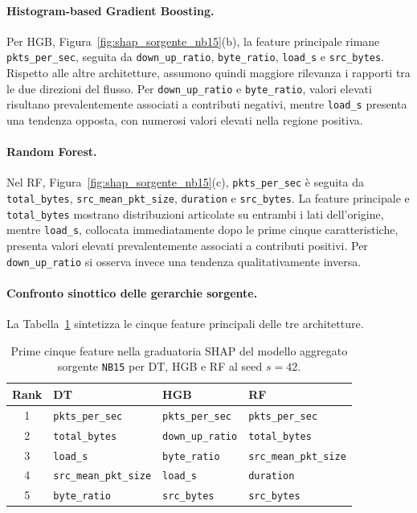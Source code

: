 \paragraph{Histogram-based Gradient Boosting.}
Per HGB, Figura~\ref{fig:shap_sorgente_nb15}(b), la feature principale rimane \texttt{pkts\_per\_sec}, seguita da \texttt{down\_up\_ratio}, \texttt{byte\_ratio}, \texttt{load\_s} e \texttt{src\_bytes}. 
Rispetto alle altre architetture, assumono quindi maggiore rilevanza i rapporti tra le due direzioni del flusso. 
Per \texttt{down\_up\_ratio} e \texttt{byte\_ratio}, valori elevati risultano prevalentemente associati a contributi negativi, mentre \texttt{load\_s} presenta una tendenza opposta, con numerosi valori elevati nella regione positiva.

\paragraph{Random Forest.}
Nel RF, Figura~\ref{fig:shap_sorgente_nb15}(c), \texttt{pkts\_per\_sec} è seguita da \texttt{total\_bytes}, \newline \texttt{src\_mean\_pkt\_size}, \texttt{duration} e \texttt{src\_bytes}. 
La feature principale e \texttt{total\_bytes} mostrano distribuzioni articolate su entrambi i lati dell'origine, mentre \texttt{load\_s}, collocata immediatamente dopo le prime cinque caratteristiche, presenta valori elevati prevalentemente associati a contributi positivi. 
Per \texttt{down\_up\_ratio} si osserva invece una tendenza qualitativamente inversa.

\paragraph{Confronto sinottico delle gerarchie sorgente.}
La Tabella~\ref{tab:sorgente_shap_top5} sintetizza le cinque feature principali delle tre architetture.

\begin{table}[H]
    \centering
    \small
    \caption{Prime cinque feature nella graduatoria SHAP del modello aggregato sorgente \texttt{NB15} per DT, HGB e RF al seed $s=42$.}
    \label{tab:sorgente_shap_top5}
    \begin{tabular}{c|lll}
        \toprule
        \textbf{Rank} & \textbf{DT} & \textbf{HGB} & \textbf{RF} \\
        \midrule
        1 & \texttt{pkts\_per\_sec} & \texttt{pkts\_per\_sec} & \texttt{pkts\_per\_sec} \\
        2 & \texttt{total\_bytes} & \texttt{down\_up\_ratio} & \texttt{total\_bytes} \\
        3 & \texttt{load\_s} & \texttt{byte\_ratio} & \texttt{src\_mean\_pkt\_size} \\
        4 & \texttt{src\_mean\_pkt\_size} & \texttt{load\_s} & \texttt{duration} \\
        5 & \texttt{byte\_ratio} & \texttt{src\_bytes} & \texttt{src\_bytes} \\
        \bottomrule
    \end{tabular}
\end{table}

